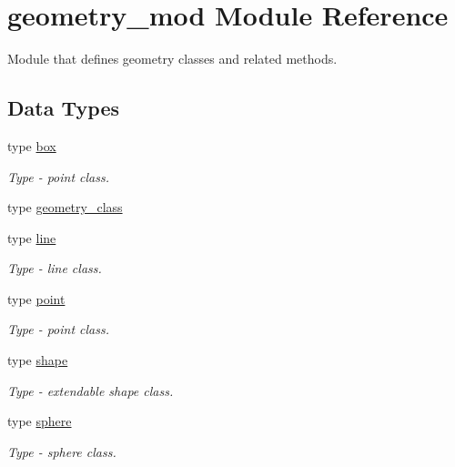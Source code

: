 \hypertarget{namespacegeometry__mod}{}\section{geometry\+\_\+mod Module Reference}
\label{namespacegeometry__mod}


Module that defines geometry classes and related methods.  


\subsection*{Data Types}
\begin{DoxyCompactItemize}
\item 
type \hyperlink{structgeometry__mod_1_1box}{box}
\begin{DoxyCompactList}\small\item\em Type -\/ point class. \end{DoxyCompactList}\item 
type \hyperlink{structgeometry__mod_1_1geometry__class}{geometry\+\_\+class}
\item 
type \hyperlink{structgeometry__mod_1_1line}{line}
\begin{DoxyCompactList}\small\item\em Type -\/ line class. \end{DoxyCompactList}\item 
type \hyperlink{structgeometry__mod_1_1point}{point}
\begin{DoxyCompactList}\small\item\em Type -\/ point class. \end{DoxyCompactList}\item 
type \hyperlink{structgeometry__mod_1_1shape}{shape}
\begin{DoxyCompactList}\small\item\em Type -\/ extendable shape class. \end{DoxyCompactList}\item 
type \hyperlink{structgeometry__mod_1_1sphere}{sphere}
\begin{DoxyCompactList}\small\item\em Type -\/ sphere class. \end{DoxyCompactList}\end{DoxyCompactItemize}

